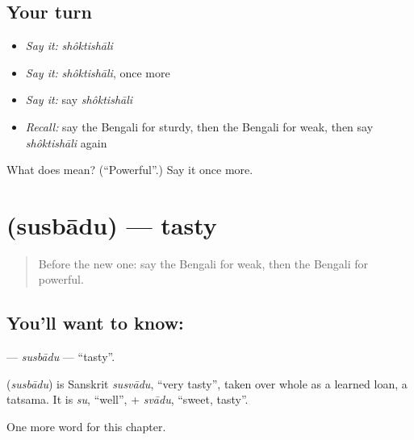 \subsection*{Your turn}
\begin{itemize}
\raggedright
  \item \emph{Say it:} \emph{shôktishāli}
  \item \emph{Say it:} \emph{shôktishāli}, once more
  \item \emph{Say it:} say \emph{shôktishāli}
  \item \emph{Recall:} say the Bengali for sturdy, then the Bengali for weak, then say \emph{shôktishāli} again
\end{itemize}

\begin{tcolorbox}[breakable,colback=teal!4,colframe=teal!35!black,title={Before you move on}]
What does  mean? (\textquotedblleft{}Powerful\textquotedblright{}.) Say it once more.
\end{tcolorbox}
\section[\texorpdfstring{\bn{সুস্বাদু} (susbādu)}{সুস্বাদু (susbādu)}]{ (susbādu) — tasty}

\label{lesson:BN-C143-susbadu}



\begin{quote}
Before the new one: say the Bengali for weak, then the Bengali for powerful.
\end{quote}

\subsection*{You'll want to know: }
\textbf{} — \emph{susbādu} — \textquotedblleft{}tasty\textquotedblright{}.

\begin{cousinweb}
\textbf{} (\emph{susbādu}) is Sanskrit \emph{susvādu}, \textquotedblleft{}very tasty\textquotedblright{}, taken over whole as a learned loan, a tatsama. It is \emph{su}, \textquotedblleft{}well\textquotedblright{}, + \emph{svādu}, \textquotedblleft{}sweet, tasty\textquotedblright{}.
\end{cousinweb}

\begin{grammarlens}[title={What you've built}]
One more word for this chapter.
\end{grammarlens}

